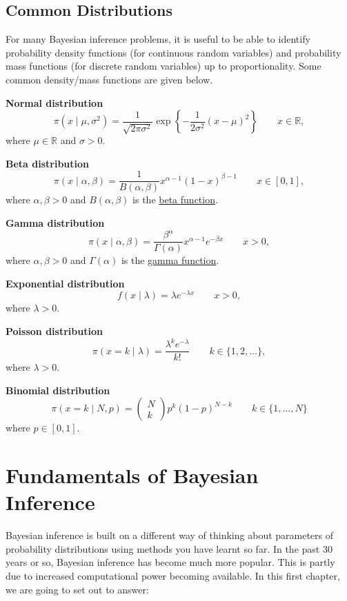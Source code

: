 \documentclass[
]{book}
\theoremstyle{definition}
\theoremstyle{definition}
\theoremstyle{definition}
\theoremstyle{definition}
\theoremstyle{remark}
\begin{document}
\hypertarget{common-distributions}{%
\section{Common Distributions}\label{common-distributions}}

For many Bayesian inference problems, it is useful to be able to identify probability density functions (for continuous random variables) and probability mass functions (for discrete random variables) up to proportionality. Some common density/mass functions are given below.

\textbf{Normal distribution}
\[
\pi(x \mid \mu, \sigma^2) = \frac{1}{\sqrt{2\pi\sigma^2}}\exp\left\{-\frac{1}{2\sigma^2}(x-\mu)^2\right\} \qquad x \in\mathbb{R},
\]
where \(\mu \in \mathbb{R}\) and \(\sigma > 0\).

\textbf{Beta distribution}
\[
\pi(x\mid \alpha, \beta) = \frac{1}{B(\alpha, \beta)}x^{\alpha-1}(1-x)^{\beta - 1} \qquad  x \in [0, 1],
\]
where \(\alpha, \beta > 0\) and \(B(\alpha, \beta)\) is the \href{https://en.wikipedia.org/wiki/Beta_function}{beta function}.

\textbf{Gamma distribution}
\[
\pi(x\mid \alpha, \beta) = \frac{\beta^\alpha}{\Gamma(\alpha)}x^{\alpha - 1}e^{-\beta x} \qquad  x > 0,
\]
where \(\alpha, \beta > 0\) and \(\Gamma(\alpha)\) is the \href{https://en.wikipedia.org/wiki/Gamma_function}{gamma function}.

\textbf{Exponential distribution}
\[
f(x \mid \lambda) = \lambda e^{-\lambda x} \qquad x > 0,
\]
where \(\lambda > 0\).

\textbf{Poisson distribution}
\[
\pi(x = k \mid \lambda) = \frac{\lambda^k e^{-\lambda}}{k!} \qquad k \in \{1, 2, \ldots\},
\]
where \(\lambda > 0\).

\textbf{Binomial distribution}
\[
\pi(x = k \mid N, p) = \begin{pmatrix} N \\ k\end{pmatrix} p^k (1-p)^{N-k} \qquad k \in \{1, \ldots, N\}
\]
where \(p \in [0, 1]\).

\hypertarget{fundamentals}{%
\chapter{Fundamentals of Bayesian Inference}\label{fundamentals}}

Bayesian inference is built on a different way of thinking about parameters of probability distributions using methods you have learnt so far. In the past 30 years or so, Bayesian inference has become much more popular. This is partly due to increased computational power becoming available. In this first chapter, we are going to set out to answer:
\end{document}
